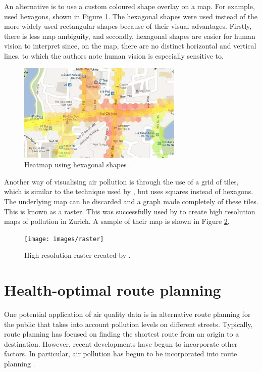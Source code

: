 \documentclass[11pt,twosided,a4paper]{report}
\begin{document}
An alternative is to use a custom coloured shape overlay on a map. For example, \cite{Hoang2013hanoihexagons} used hexagons, shown in Figure \ref{hanoihexagons}. The hexagonal shapes were used instead of the more widely used rectangular shapes because of their visual advantages. Firstly, there is less map ambiguity, and secondly, hexagonal shapes are easier for human vision to interpret since, on the map, there are no distinct horizontal and vertical lines, to which the authors note human vision is especially sensitive to. 

\begin{figure}[!tb]
\centering
\includegraphics[width=0.7\textwidth]{hanoihexagons}
\caption{Heatmap using hexagonal shapes \citep{Hoang2013hanoihexagons}.}
\label{hanoihexagons}
\end{figure}

Another way of visualising air pollution is through the use of a grid of tiles, which is similar to the technique used by \citeauthor{Hoang2013hanoihexagons}, but uses squares instead of hexagons. The underlying map can be discarded and a graph made completely of these tiles. This is known as a raster. This was successfully used by \cite{Hasenfratz2015highresmapsTram} to create high resolution maps of pollution in Zurich. A sample of their map is shown in Figure \ref{fig:raster}.

\begin{figure}[!htb]
\centering
\texttt{[image: images/raster]}
\caption{High resolution raster created by \cite{Hasenfratz2015highresmapsTram}.}
\label{fig:raster}
\end{figure}

\section{Health-optimal route planning}

One potential application of air quality data is in alternative route planning for the public that takes into account pollution levels on different streets. Typically, route planning has focused on finding the shortest route from an origin to a destination. However, recent developments have begun to incorporate other factors. In particular, air pollution has begun to be incorporated into route planning \citep{sharker2014exposureroutes, Hasenfratz2015highresmapsTram}.
\end{document}
